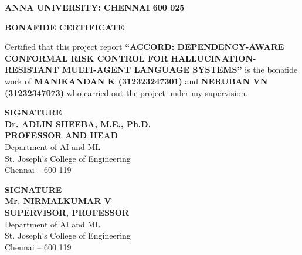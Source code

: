 \documentclass[12pt,a4paper]{report}
\begin{document}
\newpage
\thispagestyle{empty}
\begin{center}
  \textbf{\large ANNA UNIVERSITY: CHENNAI 600 025}

  \vspace{0.5cm}

  \vspace{0.5cm}
  \textbf{\Large BONAFIDE CERTIFICATE}
\end{center}

\vspace{0.8cm}
\hspace{1cm}
Certified that this project report \textbf{``ACCORD: DEPENDENCY-AWARE CONFORMAL RISK CONTROL FOR HALLUCINATION-RESISTANT MULTI-AGENT LANGUAGE SYSTEMS''} is the bonafide work of \textbf{MANIKANDAN K (312323247301)} and \textbf{NERUBAN VN   (31232347073)} who carried out the project under my supervision.

\vspace{3cm}
\noindent
\begin{minipage}[t]{0.45\textwidth}
  \textbf{SIGNATURE}\\[1.5cm]
  \textbf{Dr. ADLIN SHEEBA, M.E., Ph.D.}\\
  \textbf{PROFESSOR AND HEAD}\\
  Department of AI and ML\\
  St. Joseph's College of Engineering\\
  Chennai -- 600 119
\end{minipage}
\hfill
\begin{minipage}[t]{0.45\textwidth}
  \textbf{SIGNATURE}\\[1.5cm]
  \textbf{Mr. NIRMALKUMAR V}\\
  \textbf{SUPERVISOR, PROFESSOR}\\
  Department of AI and ML\\
  St. Joseph's College of Engineering\\
  Chennai -- 600 119
\end{minipage}

\vspace{1cm}
\begin{center}
  \thepage
\end{center}
\end{document}
